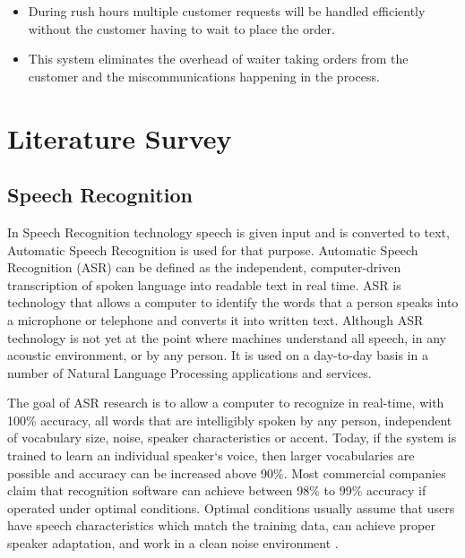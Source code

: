 \documentclass[conference]{IEEEtran}
\begin{document}
\begin{itemize}
	
	\item During rush hours multiple customer requests will be handled efficiently without the customer having to wait to place the order. 
	
	\item This system eliminates the overhead of waiter taking orders from the customer and the miscommunications happening in the process. 
	
\end{itemize}


\section{Literature Survey}

\subsection{\textbf{Speech Recognition}}
In Speech Recognition technology speech is given input and is converted to text, Automatic Speech Recognition is used for that purpose. Automatic Speech Recognition (ASR) can be defined as the independent, computer-driven transcription of spoken language into readable text in real time. ASR is technology that allows a computer to identify the words that a person speaks into a microphone or telephone and converts it into written text. Although ASR technology is not yet at the point where machines understand all speech, in any acoustic environment, or by any person. It is used on a day-to-day basis in a number of Natural Language Processing applications and services. 

The goal of ASR research is to allow a computer to recognize in real-time, with 100\% accuracy, all words that are intelligibly spoken by any person, independent of vocabulary size, noise, speaker characteristics or accent. Today, if the system is trained to learn an individual speaker‘s voice, then larger vocabularies are possible and accuracy can be increased above 90\%. Most commercial companies claim that recognition software can achieve between 98\% to 99\% accuracy if operated under optimal conditions. Optimal conditions usually assume that users have speech characteristics which match the training data, can achieve proper speaker adaptation, and work in a clean noise environment \cite{b1}. 
\end{document}
